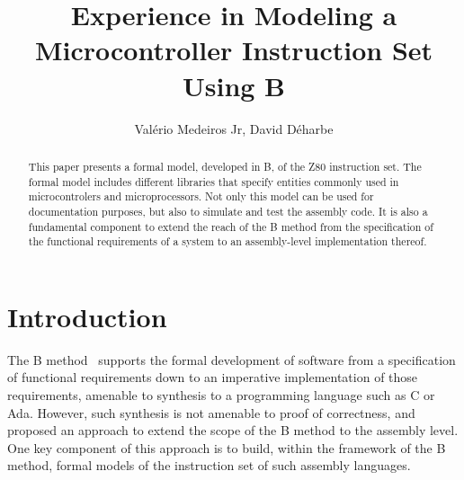 \documentclass[a4paper]{llncs}
\begin{document}
\title{Experience in Modeling a Microcontroller Instruction Set Using B}
%


\author{Val\'{e}rio Medeiros Jr, David D\'{e}harbe}



\maketitle


\begin{abstract}

  This paper presents a formal model, developed in B, of the Z80
  instruction set. The formal model includes different libraries that
  specify entities commonly used in microcontrolers and
  microprocessors. Not only this model can be used for documentation
  purposes, but also to simulate and test the assembly code. It is also
  a fundamental component to extend the reach of the B method from the
  specification of the functional requirements of a system to an assembly-level
  implementation thereof.

\end{abstract}



\section{Introduction}

The B method~\cite{Abrial} supports the formal development of software
from a specification of functional requirements down to an imperative
implementation of those requirements, amenable to synthesis to a
programming language such as C or Ada. However, such synthesis is
not amenable to proof of correctness, and~\cite{Dantas_SBMF08} proposed
an approach to extend the scope of the B method  to the assembly
level. One key component of this approach is to build, within
the framework of the B method, formal models of the instruction set of
such assembly languages.
\end{document}
